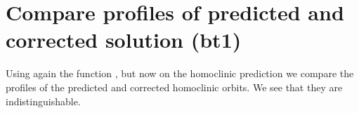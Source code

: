 \documentclass[letterpaper,10pt,english]{jupyterBook}
\begin{document}
\begin{sphinxVerbatim}[commandchars=\\\{\}]
\PYG{p}{[}\PYG{p}{]}
\PYG{p}{[}\PYG{p}{]}
\end{sphinxVerbatim}


\section{Compare profiles of predicted and corrected solution (bt1)}
\label{\detokenize{CO-oxidation:compare-profiles-of-predicted-and-corrected-solution-bt1}}
\sphinxAtStartPar
Using again the  function , but now on the homoclinic
prediction  we compare the profiles of the predicted and corrected
homoclinic orbits. We see that they are indistinguishable.
\end{document}
